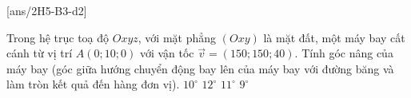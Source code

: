 \setcounter{ex}{0}
[ans/2H5-B3-d2]

\begin{ex}
		Trong hệ trục toạ độ $Oxyz$, với mặt phẳng $(Ox y)$ là mặt đất, một máy bay cất cánh từ vị trí $A(0; 10; 0)$ với vận tốc $\vec{v}=(150; 150; 40)$. Tính góc nâng của máy bay (góc giữa hướng chuyển động bay lên của máy bay với đường băng và làm tròn kết quả đến hàng đơn vị).
		\choice
		{$10^{\circ}$}
		{$12^{\circ}$}
		{\True $11^{\circ}$}
		{$9^{\circ}$}
\end{ex}


